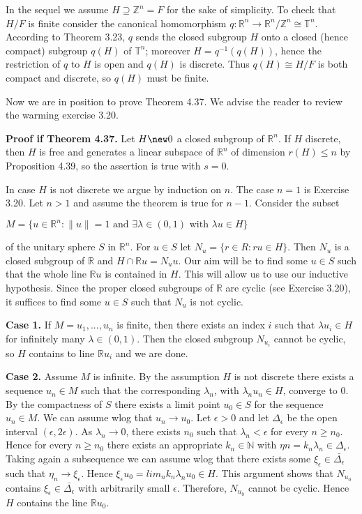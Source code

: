\documentclass[12pt]{article}
\begin{document}
    In the sequel we assume $H \supseteq \mathbb{Z}^n = F$ for the sake of simplicity. To check that $H/F$ is finite consider the
canonical homomorphism $q : \mathbb{R}^n \to \mathbb{R}^n/\mathbb{Z}^n \cong \mathbb{T}^n$. According to Theorem 3.23, $q$ sends the closed subgroup $H$
onto a closed (hence compact) subgroup $q(H)$ of $\mathbb{T}^n$; moreover $H = q^{-1}(q(H))$, hence the restriction of $q$ to $H$
is open and $q(H)$ is discrete. Thus $q(H) \cong H/F$ is both compact and discrete, so $q(H)$ must be finite.


Now we are in position to prove Theorem 4.37. We advise the reader to review the warming exercise 3.20.


\textbf{Proof if Theorem 4.37.} Let $H \new 0$ a closed subgroup of $\mathbb{R}^n$. If $H$ discrete, then $H$ is free and generates a
linear subspace of $\mathbb{R}^n$ of dimension $r(H) \leq n$ by Proposition 4.39, so the assertion is true with $s = 0$.


    In case $H$ is not discrete we argue by induction on $n$. The case $n = 1$ is Exercise 3.20. Let $n > 1$ and assume
the theorem is true for $n - 1$. Consider the subset


    $M = \{u \in \mathbb{R}^n: \|u\| = 1 \text{ and } \exists \lambda \in (0, 1) \text{ with } \lambda u \in H\}$


of the unitary sphere $S$ in $\mathbb{R}^n$. For $u \in S$ let $N_u = \{r \in R : ru \in H\}$. Then $N_u$ is a closed subgroup of $\mathbb{R}$ and
$H \cap \mathbb{R}u = N_u u$. Our aim will be to find some $u \in S$ such that the whole line $\mathbb{R}u$ is contained in $H$. This will
allow us to use our inductive hypothesis. Since the proper closed subgroups of $\mathbb{R}$ are cyclic (see Exercise 3.20),
it suffices to find some $u \in S$ such that $N_u$ is not cyclic.


    \textbf{Case 1.} If $M = {u_1, . . . , u_n}$ is finite, then there exists an index $i$ such that $\lambda u_i \in H$ for infinitely many
$\lambda \in (0, 1)$. Then the closed subgroup $N_{u_i}$ cannot be cyclic, so $H$ contains to line $\mathbb{R}u_i$ and we are done.


    \textbf{Case 2.} Assume $M$ is infinite. By the assumption $H$ is not discrete there exists a sequence $u_n \in M$ such
that the corresponding $\lambda_n$, with $\lambda_n u_n \in H$, converge to 0. By the compactness of $S$ there exists a limit point
$u_0 \in S$ for the sequence $u_n \in M$. We can assume wlog that $u_n \to u_0$. Let $\epsilon > 0$ and let $\Delta_\epsilon$ be the open interval
$(\epsilon, 2\epsilon)$. As $\lambda_n \to 0$, there exists $n_0$ such that $\lambda_n < \epsilon$ for every $n \geq n_0$. Hence for every $n \geq n_0$ there exists an
appropriate $k_n \in \mathbb{N}$ with $\eta n = k_n \lambda_n ∈ \Delta_\epsilon$. Taking again a subsequence we can assume wlog that there exists
some $\xi_\epsilon \in \bar{\Delta_\epsilon}$ such that $\eta_n \to \xi_\epsilon$. Hence $\xi_\epsilon u_0 = lim_n k_n \lambda_n u_0 \in H$. This argument shows that $N_{u_0}$ contains
$\xi_\epsilon \in \bar{\Delta_\epsilon}$ with arbitrarily small $\epsilon$. Therefore, $N_{u_0}$ cannot be cyclic. Hence $H$ contains the line $\mathbb{R}u_0$.
\end{document}
